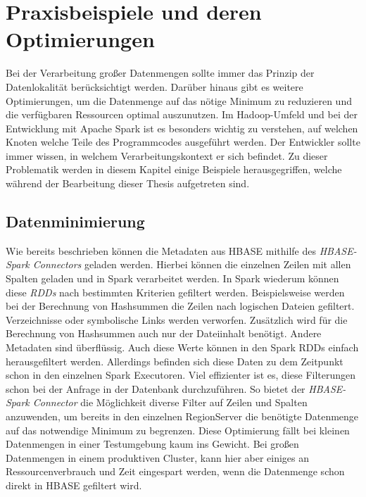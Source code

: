 \section{Praxisbeispiele und deren Optimierungen}
Bei der Verarbeitung großer Datenmengen sollte immer das Prinzip der Datenlokalität berücksichtigt werden. Darüber hinaus gibt es weitere Optimierungen, um die Datenmenge auf das nötige Minimum zu reduzieren und die verfügbaren Ressourcen optimal auszunutzen. Im Hadoop-Umfeld und bei der Entwicklung mit Apache Spark ist es besonders wichtig zu verstehen, auf welchen Knoten welche Teile des Programmcodes ausgeführt werden. Der Entwickler sollte immer wissen, in welchem Verarbeitungskontext er sich befindet. Zu dieser Problematik werden in diesem Kapitel einige Beispiele herausgegriffen, welche während der Bearbeitung dieser Thesis aufgetreten sind.\\

\subsection*{Datenminimierung}
Wie bereits beschrieben können die Metadaten aus HBASE mithilfe des \textit{HBASE-Spark Connectors} geladen werden. Hierbei können die einzelnen Zeilen mit allen Spalten geladen und in Spark verarbeitet werden. In Spark wiederum können diese \textit{RDDs} nach bestimmten Kriterien gefiltert werden. Beispielsweise werden bei der Berechnung von Hashsummen die Zeilen nach logischen Dateien gefiltert. Verzeichnisse oder symbolische Links werden verworfen. Zusätzlich wird für die Berechnung von Hashsummen auch nur der Dateiinhalt benötigt. Andere Metadaten sind überflüssig. Auch diese Werte können in den Spark RDDs einfach herausgefiltert werden. Allerdings befinden sich diese Daten zu dem Zeitpunkt schon in den einzelnen Spark Executoren. Viel effizienter ist es, diese Filterungen schon bei der Anfrage in der Datenbank durchzuführen. So bietet der \textit{HBASE-Spark Connector} die Möglichkeit diverse Filter auf Zeilen und Spalten anzuwenden, um bereits in den einzelnen RegionServer die benötigte Datenmenge auf das notwendige Minimum zu begrenzen. Diese Optimierung fällt bei kleinen Datenmengen in einer Testumgebung kaum ins Gewicht. Bei großen Datenmengen in einem produktiven Cluster, kann hier aber einiges an Ressourcenverbrauch und Zeit eingespart werden, wenn die Datenmenge schon direkt in HBASE gefiltert wird.\\

